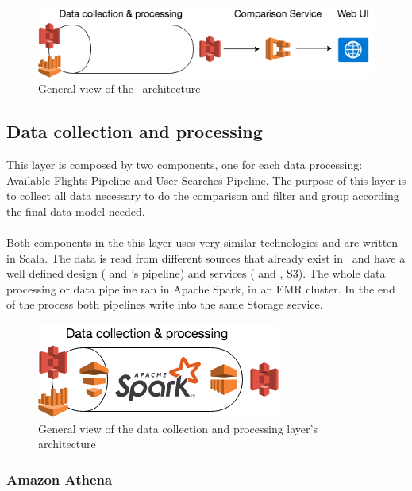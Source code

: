\begin{figure}[H]
\centering
\includegraphics[scale=0.7]{diagrams/architecture01.png}
\caption{General view of the \thesis\ architecture}
\end{figure}


\subsection{Data collection and processing} \label{data_layer}

This layer is composed by two components, one for each data processing: Available Flights Pipeline and User Searches Pipeline. The purpose of this layer is to collect all data necessary to do the comparison and filter and group according the final data model needed.
\\\\
Both components in the this layer uses very similar technologies and are written in Scala\cite{scala}. The data is read from different sources that already exist in \company\ and have a well defined design ( and \squad's pipeline) and services ( and , S3). The whole data processing or data pipeline ran in Apache Spark, in an EMR cluster. In the end of the process both pipelines write into the same Storage service.

\begin{figure}[H]
\centering
\includegraphics[scale=0.7]{diagrams/architecture-data.png}
\caption{General view of the data collection and processing layer's architecture}
\end{figure}

\subsubsection{Amazon Athena} \label{athena}

